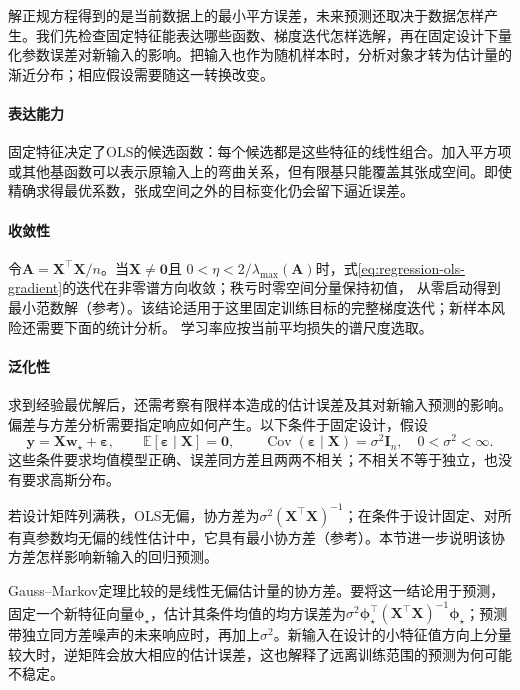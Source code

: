 解正规方程得到的是当前数据上的最小平方误差，未来预测还取决于数据怎样产生。我们先检查固定特征能表达哪些函数、梯度迭代怎样选解，再在固定设计下量化参数误差对新输入的影响。把输入也作为随机样本时，分析对象才转为估计量的渐近分布；相应假设需要随这一转换改变。

\paragraph{表达能力}
固定特征决定了OLS的候选函数：每个候选都是这些特征的线性组合。加入平方项或其他基函数可以表示原输入上的弯曲关系，但有限基只能覆盖其张成空间。即使精确求得最优系数，张成空间之外的目标变化仍会留下逼近误差。

\paragraph{收敛性}
令$\bm A=\bm X^\top\bm X/n$。当$\bm X\ne\bm0$且
$0<\eta<2/\lambda_{\max}(\bm A)$时，式\eqref{eq:regression-ols-gradient}的迭代在非零谱方向收敛；秩亏时零空间分量保持初值，
从零启动得到最小范数解（参考）。该结论适用于这里固定训练目标的完整梯度迭代；新样本风险还需要下面的统计分析。
学习率应按当前平均损失的谱尺度选取。

\paragraph{泛化性}
求到经验最优解后，还需考察有限样本造成的估计误差及其对新输入预测的影响。偏差与方差分析需要指定响应如何产生。以下条件于固定设计，假设
\begin{equation}
  \bm{y}=\bm{X}\bm{w}_{\star}+\bm{\varepsilon},\qquad
  \mathbb{E}[\bm{\varepsilon}\mid\bm{X}]=\bm{0},\qquad
  \operatorname{Cov}(\bm{\varepsilon}\mid\bm{X})=\sigma^2\bm{I}_n,
  \quad 0<\sigma^2<\infty.
  \label{eq:regression-gauss-markov-model}
\end{equation}
这些条件要求均值模型正确、误差同方差且两两不相关；不相关不等于独立，也没有要求高斯分布。

若设计矩阵列满秩，OLS无偏，协方差为$\sigma^2(\bm X^\top\bm X)^{-1}$；在条件于设计固定、对所有真参数均无偏的线性估计中，它具有最小协方差（参考）。本节进一步说明该协方差怎样影响新输入的回归预测。

Gauss--Markov定理比较的是线性无偏估计量的协方差。要将这一结论用于预测，固定一个新特征向量$\bm{\phi}_{\star}$，估计其条件均值的均方误差为$\sigma^2\bm{\phi}_{\star}^{\top}(\bm{X}^{\top}\bm{X})^{-1}\bm{\phi}_{\star}$；预测带独立同方差噪声的未来响应时，再加上$\sigma^2$。新输入在设计的小特征值方向上分量较大时，逆矩阵会放大相应的估计误差，这也解释了远离训练范围的预测为何可能不稳定。

